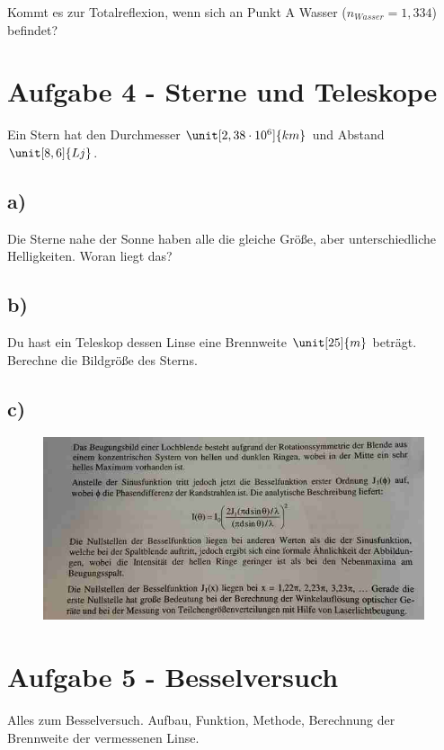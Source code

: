 Kommt es zur Totalreflexion, wenn sich an Punkt A Wasser ($n_{Wasser} = 1,334$) befindet?

\newpage

\section{Aufgabe 4 - Sterne und Teleskope}


Ein Stern hat den Durchmesser $\unit[2,38 \cdot 10^6]{km}$ und Abstand $\unit[8,6]{Lj}$.


\subsection*{a)}

Die Sterne nahe der Sonne haben alle die gleiche Größe, aber unterschiedliche Helligkeiten. Woran liegt das?


\subsection*{b)}

Du hast ein Teleskop dessen Linse eine Brennweite $\unit[25]{m}$ beträgt. Berechne die Bildgröße des Sterns.


\subsection*{c)}

\begin{figure}[h]
	\centering
	\includegraphics[scale=0.5]{A4_1.jpg}
\end{figure}

\section{Aufgabe 5 - Besselversuch}

Alles zum Besselversuch. Aufbau, Funktion, Methode, Berechnung der Brennweite der vermessenen Linse.





















